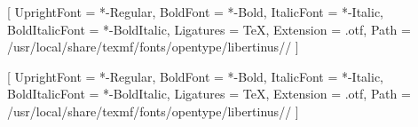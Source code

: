 {%
	\newcommand{\insertmainframenumber}{\inserttotalframenumber}
}
{%
}%


\makeatother


\usepackage{fontspec}

\def\installpath{/usr/local/share/texmf/fonts/opentype/libertinus/}
\setmainfont{LibertinusSerif}[
UprightFont    = *-Regular,
BoldFont       = *-Bold,
ItalicFont     = *-Italic,
BoldItalicFont = *-BoldItalic,
Ligatures      = TeX,
Extension      = .otf,
Path           = \installpath/
]

\setsansfont{LibertinusSerif}[
UprightFont    = *-Regular,
BoldFont       = *-Bold,
ItalicFont     = *-Italic,
BoldItalicFont = *-BoldItalic,
Ligatures      = TeX,
Extension      = .otf,
Path           = \installpath/
]








\newcommand\Wider[2][3em]{%
	\makebox[\linewidth][c]{%
		\begin{minipage}{\dimexpr\textwidth+#1\relax}
			\raggedright#2
		\end{minipage}%
	}%
}


